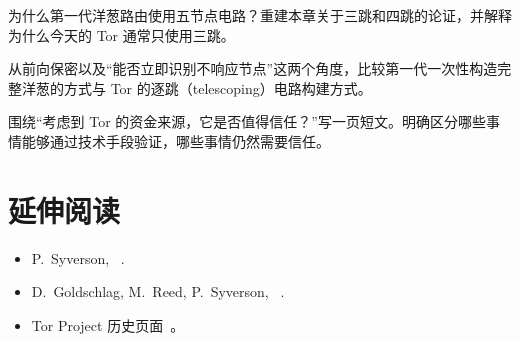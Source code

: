\begin{esercizio}[1]\label{es:03-cinque}
为什么第一代洋葱路由使用五节点电路？重建本章关于三跳和四跳的论证，并解释为什么今天的 Tor 通常只使用三跳。
\end{esercizio}

\begin{esercizio}[2]\label{es:03-cipolla}
从前向保密以及“能否立即识别不响应节点”这两个角度，比较第一代一次性构造完整洋葱的方式与 Tor 的逐跳（telescoping）电路构建方式。
\end{esercizio}

\begin{esercizio}[2]\label{es:03-fiducia}
围绕\enquote{考虑到 Tor 的资金来源，它是否值得信任？}写一页短文。明确区分哪些事情能够通过技术手段验证，哪些事情仍然需要信任。
\end{esercizio}

\section*{延伸阅读}
\begin{itemize}
  \item P.~Syverson, ~\cite{syverson2011peel}.
  \item D.~Goldschlag, M.~Reed, P.~Syverson, ~\cite{goldschlag1996hiding}.
  \item Tor Project 历史页面~\cite{torhistory}。
\end{itemize}
